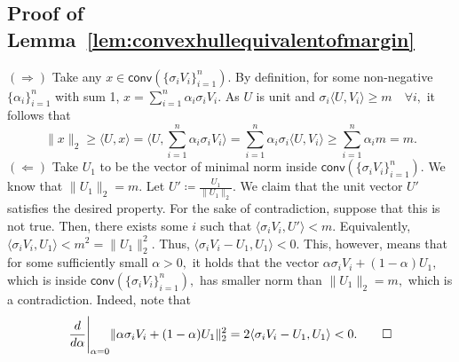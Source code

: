 \documentclass[preprint]{article}
\newcommand{\conv}{\mathsf{conv}}
\begin{document}
\subsection{Proof of Lemma~\texorpdfstring{\ref{lem:convexhullequivalentofmargin}}{Convex Hull Lemma}}
$(\Longrightarrow)$ Take any $x\in \conv(\{\sigma_i V_i\}_{i = 1}^n).$ By definition, for some non-negative $\{\alpha_i\}_{i = 1}^n$ with sum 1, $x = \sum_{i= 1}^n\alpha_i \sigma_iV_i.$ As $U$ is unit and $\sigma_i \langle U, V_i\rangle\ge m \quad \forall i,$ it follows that 
$$\|x\|_2\ge \langle U, x\rangle  =
\langle U, \sum_{i= 1}^n\alpha_i \sigma_iV_i\rangle
= \sum_{i= 1}^n\alpha_i\sigma_i
\langle U, V_i\rangle\ge 
\sum_{i= 1}^n\alpha_i m = m.
$$
$(\Longleftarrow)$ Take $U_1$ to be the vector of minimal norm inside $\conv(\{\sigma_i V_i\}_{i = 1}^n).$ We know that $\|U_1\|_2= m.$ Let $U'\coloneqq \frac{U_1}{\|U_1\|_2}.$ We claim that the unit vector $U'$ satisfies the desired property. For the sake of contradiction, suppose that this is not true. 
Then, there exists some $i$ such that $\langle \sigma_i V_i, U'\rangle <m.$ Equivalently, 
$\langle \sigma_i V_i, U_1\rangle <m^2 = \|U_1\|^2_2.$ Thus, 
$\langle \sigma_i V_i- U_1, U_1\rangle<0.$ This, however, means that for some sufficiently small $\alpha>0,$ it holds that the vector $\alpha \sigma_i V_i + (1-\alpha)U_1,$ which is inside $\conv(\{\sigma_i V_i\}_{i = 1}^n),$ has smaller norm than $\|U_1\|_2 = m,$ which is a contradiction. Indeed, note that 
\begin{align*}
\frac{d}{d\alpha}\Bigg|_{\alpha = 0} \|\alpha \sigma_i V_i + (1-\alpha)U_1\|^2_2 = 2\langle \sigma_i V_i - U_1, U_1\rangle <0.\qedhere
\end{align*}

\end{document}
